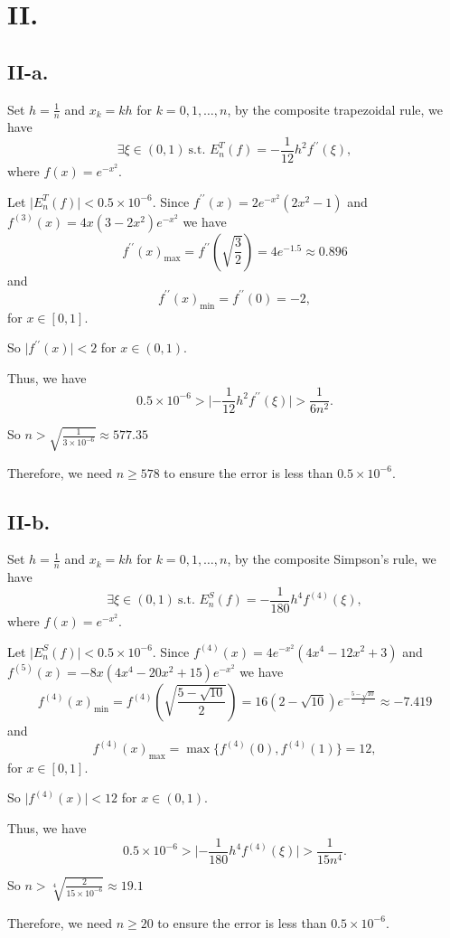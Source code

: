 \documentclass[a4paper]{article}
\begin{document}
\section*{II.}
\subsection*{II-a.}
Set $h=\frac{1}{n}$ and $x_k=kh$ for $k=0,1,\ldots,n$, by the composite trapezoidal rule, we have 
$$
\exists \xi\in(0,1)\ \text{s.t. } E_n^T(f)=-\frac{1}{12}h^2f^{\prime\prime}(\xi),
$$
where $f(x)=e^{-x^2}.$

Let $\lvert E_n^T(f) \rvert<0.5\times10^{-6}$. Since $f^{\prime\prime}(x)=2e^{-x^2}(2x^2-1)$ and $f^{(3)}(x)=4x(3-2x^2)e^{-x^2}$ we have
$$
f^{\prime\prime}(x)_{\max}=f^{\prime\prime}(\sqrt{\frac{3}{2}})=4e^{-1.5}\approx 0.896
$$
and 
$$
f^{\prime\prime}(x)_{\min}=f^{\prime\prime}(0)=-2,
$$
for $x\in[0,1]$.

So $\lvert f^{\prime\prime}(x)\rvert < 2$ for $x\in(0,1).$

Thus, we have
$$
0.5\times10^{-6}>\lvert-\frac{1}{12}h^2f^{\prime\prime}(\xi)\rvert> \frac{1}{6n^2}.
$$

So $n>\sqrt{\frac{1}{3\times10^{-6}}}\approx 577.35$

Therefore, we need $n\geq 578$ to ensure the error is less than $0.5\times10^{-6}$.

\subsection*{II-b.}
Set $h=\frac{1}{n}$ and $x_k=kh$ for $k=0,1,\ldots,n$, by the composite Simpson's rule, we have 
$$
\exists \xi\in(0,1)\ \text{s.t. } E_n^S(f)=-\frac{1}{180}h^4f^{(4)}(\xi),
$$
where $f(x)=e^{-x^2}.$

Let $\lvert E_n^S(f) \rvert<0.5\times10^{-6}$. Since $f^{(4)}(x)=4e^{-x^2}(4x^4-12x^2+3)$ and $f^{(5)}(x)=-8x(4x^4-20x^2+15)e^{-x^2}$ we have
$$
f^{(4)}(x)_{\min}=f^{(4)}(\sqrt{\frac{5-\sqrt{10}}{2}})=16(2-\sqrt{10})e^{-\frac{5-\sqrt{10}}{2}}\approx -7.419
$$
and 
$$
f^{(4)}(x)_{\max}=\max\{f^{(4)}(0),f^{(4)}(1)\}=12,
$$
for $x\in[0,1]$.

So $\lvert f^{(4)}(x)\rvert < 12$ for $x\in(0,1).$

Thus, we have
$$
0.5\times10^{-6}>\lvert-\frac{1}{180}h^4f^{(4)}(\xi)\rvert> \frac{1}{15n^4}.
$$

So $n>\sqrt[4]{\frac{2}{15\times10^{-6}}}\approx 19.1$

Therefore, we need $n\geq 20$ to ensure the error is less than $0.5\times10^{-6}$.
\end{document}
